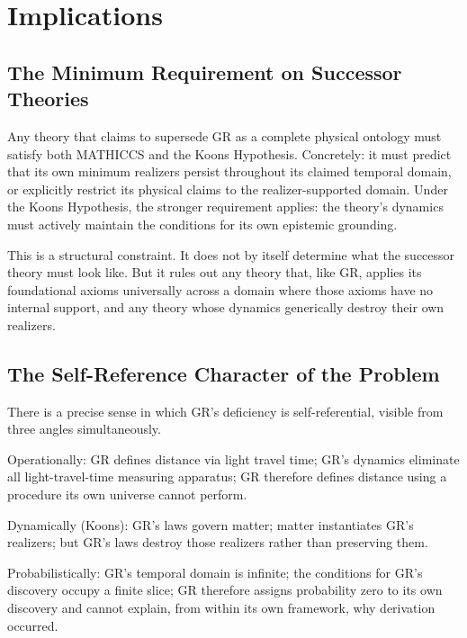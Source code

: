\documentclass[11pt,a4paper]{article}
\begin{document}
\section{Implications}
\label{sec:implications}

\subsection{The Minimum Requirement on Successor Theories}

Any theory that claims to supersede GR as a complete physical ontology must satisfy
both MATHICCS and the Koons Hypothesis. Concretely: it must predict that its own
minimum realizers persist throughout its claimed temporal domain, or explicitly
restrict its physical claims to the realizer-supported domain. Under the Koons
Hypothesis, the stronger requirement applies: the theory's dynamics must actively
maintain the conditions for its own epistemic grounding.

This is a structural constraint. It does not by itself determine what the successor
theory must look like. But it rules out any theory that, like GR, applies its
foundational axioms universally across a domain where those axioms have no internal
support, and any theory whose dynamics generically destroy their own realizers.

\subsection{The Self-Reference Character of the Problem}

There is a precise sense in which GR's deficiency is self-referential, visible from
three angles simultaneously.

Operationally: GR defines distance via light travel time; GR's dynamics eliminate all
light-travel-time measuring apparatus; GR therefore defines distance using a procedure
its own universe cannot perform.

Dynamically (Koons): GR's laws govern matter; matter instantiates GR's realizers; but
GR's laws destroy those realizers rather than preserving them.

Probabilistically: GR's temporal domain is infinite; the conditions for GR's discovery
occupy a finite slice; GR therefore assigns probability zero to its own discovery and
cannot explain, from within its own framework, why derivation occurred.
\end{document}
